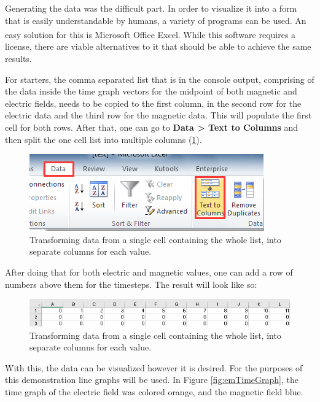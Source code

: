 Generating the data was the difficult part. In order to visualize it into a form that is easily understandable by humans, a variety of programs can be used. An easy solution for this is Microsoft Office Excel\textsuperscript{\cite{excel}}. While this software requires a license, there are viable alternatives to it that should be able to achieve the same results.

For starters, the comma separated list that is in the console output, comprising of the data inside the time graph vectors for the midpoint of both magnetic and electric fields, needs to be copied to the first column, in the second row for the electric data and the third row for the magnetic data. This will populate the first cell for both rows. After that, one can go to \textbf{Data > Text to Columns} and then split the one cell list into multiple columns (\ref{fig:fdtd1dexcel1}).

\begin{figure}[h!]
	\centering
	\includegraphics{Figures/fdtd1dexcel1}
	\decoRule
	\caption[1D Excel - Text to Columns]{Transforming data from a single cell containing the whole list, into separate columns for each value.}
	\label{fig:fdtd1dexcel1}
\end{figure}

After doing that for both electric and magnetic values, one can add a row of numbers above them for the timesteps. The result will look like so:

\begin{figure}[h!]
	\centering
	\includegraphics{Figures/fdtd1dexcel2}
	\decoRule
	\caption[1D Excel - Text to Columns]{Transforming data from a single cell containing the whole list, into separate columns for each value.}
	\label{fig:fdtd1dexcel2}
\end{figure}

\clearpage

With this, the data can be visualized however it is desired. For the purposes of this demonstration line graphs will be used. In Figure \ref{fig:emTimeGraph}, the time graph of the electric field was colored orange, and the magnetic field blue.

